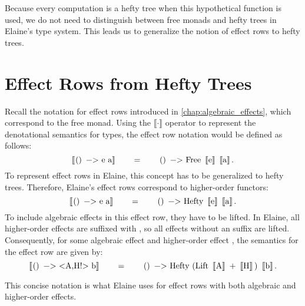 Because every computation is a hefty tree when this hypothetical  function is used, we do not need to distinguish between free monads and hefty trees in Elaine's type system. This leads us to generalize the notion of effect rows to hefty trees.

\section{Effect Rows from Hefty Trees}\label{sec:hoeffectrow}
\newcommand\BB[1]{\left\llbracket\mcode{#1}\right\rrbracket}

Recall the notation for effect rows introduced in \cref{chap:algebraic_effects}, which correspond to the free monad. Using the $\llbracket\cdot\rrbracket$ operator to represent the denotational semantics for types, the effect row notation would be defined as follows:
\[
  \BB{() -> e a}
  \qquad=\qquad
  \mcode{() -> Free}\ \BB{e}\ \BB{a}.
\]
To represent effect rows in Elaine, this concept has to be generalized to hefty trees. Therefore, Elaine's effect rows correspond to higher-order functors:
\[
  \BB{() -> e a}
  \qquad=\qquad
  \mcode{() -> Hefty}\ \BB{e}\ \BB{a}.
\]
To include algebraic effects in this effect row, they have to be lifted. In Elaine, all higher-order effects are suffixed with \hs{!}, so all effects without an \el{!} suffix are lifted. Consequently, for some algebraic effect  and higher-order effect , the semantics for the effect row are given by:
\[
  \BB{() -> <A,H!> b}
  \qquad=\qquad
  \mcode{() -> Hefty (Lift}
    \ \BB{A}
    \ \mcode{+}
    \ \BB{H}
    \mcode{)}
    \ \BB{b}.
\]

This concise notation is what Elaine uses for effect rows with both algebraic and higher-order effects.
